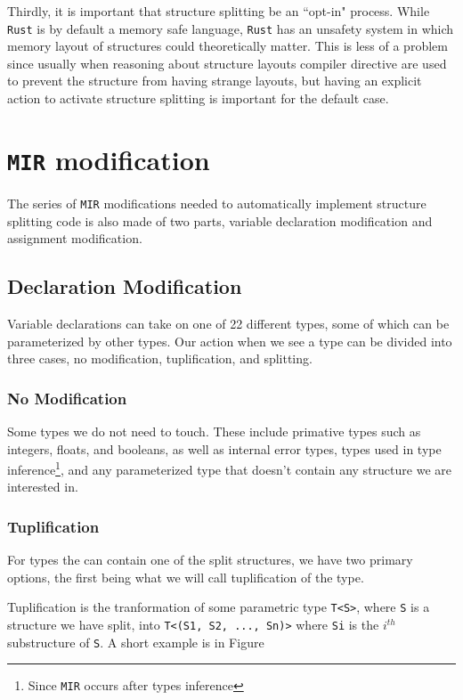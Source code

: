 \documentclass[12pt,oneside]{book}
\newcommand{\rustname}{{\texttt{Rust}}}
\def \rust {\rustname{}\xspace}
\newcommand{\mirname}{{\texttt{MIR}}}
\def \mir {\mirname{}\xspace}
\begin{document}
Thirdly, it is important that structure splitting be an ``opt-in" process.
While \rust is by default a memory safe language, \rust has an
unsafety system in which memory layout of structures could theoretically matter.
This is less of a problem since usually when reasoning about structure layouts
compiler directive are used to prevent the structure from having strange
layouts, but having an explicit action to activate structure
splitting is important for the default case. 

\section{\mir modification}

The series of \mir modifications needed to automatically implement structure
splitting code is also made of two parts, variable declaration modification and
assignment modification.

\subsection{Declaration Modification}

Variable declarations can take on one of 22 different types, some of which can
be parameterized by other types. Our action when we see a type can be divided
into three cases, no modification, tuplification, and splitting.

\subsubsection{No Modification}
Some types we do not need to touch. These include primative types such as
integers, floats, and booleans, as well as internal error types, types used in
type inference\footnote{Since \mir occurs after types inference}, and any
parameterized type that doesn't contain any structure we are interested in.

\subsubsection{Tuplification}
For types the can contain one of the split structures, we have two primary
options, the first being what we will call tuplification of the type.

Tuplification is the tranformation of some parametric type \texttt{T<S>},
where \texttt{S} is a structure we have split, into
\texttt{T<(S1, S2, ..., Sn)>} where
\texttt{Si} is the $i^{th}$ substructure of \texttt{S}. 
A short example is in Figure 
\end{document}
